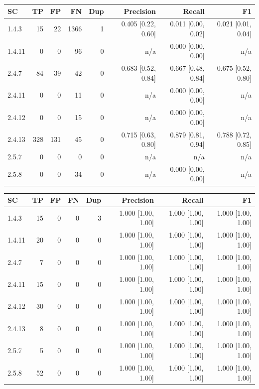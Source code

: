 \begin{tabular}{lrrrrrrr}
\hline
SC & TP & FP & FN & Dup & Precision & Recall & F1 \\
\hline
1.4.3 & 15 & 22 & 1366 & 1 & 0.405 [0.22, 0.60] & 0.011 [0.00, 0.02] & 0.021 [0.01, 0.04] \\
1.4.11 & 0 & 0 & 96 & 0 & n/a & 0.000 [0.00, 0.00] & n/a \\
2.4.7 & 84 & 39 & 42 & 0 & 0.683 [0.52, 0.84] & 0.667 [0.48, 0.84] & 0.675 [0.52, 0.80] \\
2.4.11 & 0 & 0 & 11 & 0 & n/a & 0.000 [0.00, 0.00] & n/a \\
2.4.12 & 0 & 0 & 15 & 0 & n/a & 0.000 [0.00, 0.00] & n/a \\
2.4.13 & 328 & 131 & 45 & 0 & 0.715 [0.63, 0.80] & 0.879 [0.81, 0.94] & 0.788 [0.72, 0.85] \\
2.5.7 & 0 & 0 & 0 & 0 & n/a & n/a & n/a \\
2.5.8 & 0 & 0 & 34 & 0 & n/a & 0.000 [0.00, 0.00] & n/a \\
\hline
\end{tabular}

\begin{tabular}{lrrrrrrr}
\hline
SC & TP & FP & FN & Dup & Precision & Recall & F1 \\
\hline
1.4.3 & 15 & 0 & 0 & 3 & 1.000 [1.00, 1.00] & 1.000 [1.00, 1.00] & 1.000 [1.00, 1.00] \\
1.4.11 & 20 & 0 & 0 & 0 & 1.000 [1.00, 1.00] & 1.000 [1.00, 1.00] & 1.000 [1.00, 1.00] \\
2.4.7 & 7 & 0 & 0 & 0 & 1.000 [1.00, 1.00] & 1.000 [1.00, 1.00] & 1.000 [1.00, 1.00] \\
2.4.11 & 15 & 0 & 0 & 0 & 1.000 [1.00, 1.00] & 1.000 [1.00, 1.00] & 1.000 [1.00, 1.00] \\
2.4.12 & 30 & 0 & 0 & 0 & 1.000 [1.00, 1.00] & 1.000 [1.00, 1.00] & 1.000 [1.00, 1.00] \\
2.4.13 & 8 & 0 & 0 & 0 & 1.000 [1.00, 1.00] & 1.000 [1.00, 1.00] & 1.000 [1.00, 1.00] \\
2.5.7 & 5 & 0 & 0 & 0 & 1.000 [1.00, 1.00] & 1.000 [1.00, 1.00] & 1.000 [1.00, 1.00] \\
2.5.8 & 52 & 0 & 0 & 0 & 1.000 [1.00, 1.00] & 1.000 [1.00, 1.00] & 1.000 [1.00, 1.00] \\
\hline
\end{tabular}

